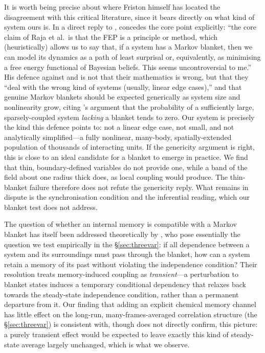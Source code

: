\documentclass[11pt]{article}
\begin{document}
It is worth being precise about where Friston himself has located the disagreement with this critical literature, since it bears directly on what kind of system ours is. In a direct reply to \citet{Raja2021}, \citeauthor{FristonUltimateTrick2022} \citep{FristonUltimateTrick2022} concedes the core point explicitly: ``the core claim of Raja et al.\ is that the FEP is a principle or method, which (heuristically) allows us to say that, if a system has a Markov blanket, then we can model its dynamics as a path of least surprisal or, equivalently, as minimising a free energy functional of Bayesian beliefs. This seems uncontroversial to me.'' \citep[p.~10]{FristonUltimateTrick2022} His defence against \citet{Aguilera2022} and \citet{Biehl2021} is not that their mathematics is wrong, but that they ``deal with the wrong kind of systems (usually, linear edge cases),'' and that genuine Markov blankets should be expected generically as system size and nonlinearity grow, citing \citet{Sakthivadivel2022}'s argument that the probability of a sufficiently large, sparsely-coupled system \emph{lacking} a blanket tends to zero. Our system is precisely the kind this defence points to: not a linear edge case, not small, and not analytically simplified---a fully nonlinear, many-body, spatially-extended population of thousands of interacting units. If the genericity argument is right, this is close to an ideal candidate for a blanket to emerge in practice. We find that thin, boundary-defined variables do not provide one, while a band of the field about one radius thick does, as local coupling would produce. The thin-blanket failure therefore does not refute the genericity reply. What remains in dispute is the synchronisation condition and the inferential reading, which our blanket test does not address.

The question of whether an internal memory is compatible with a Markov blanket has itself been addressed theoretically by \citet{ParrMemory2021}, who pose essentially the question we test empirically in the \S\ref{sec:threevar}: if all dependence between a system and its surroundings must pass through the blanket, how can a system retain a memory of its past without violating the independence condition? Their resolution treats memory-induced coupling as \emph{transient}---a perturbation to blanket states induces a temporary conditional dependency that relaxes back towards the steady-state independence condition, rather than a permanent departure from it. Our finding that adding an explicit chemical memory channel has little effect on the long-run, many-frames-averaged correlation structure (the \S\ref{sec:threevar}) is consistent with, though does not directly confirm, this picture: a purely transient effect would be expected to leave exactly this kind of steady-state average largely unchanged, which is what we observe.
\end{document}

